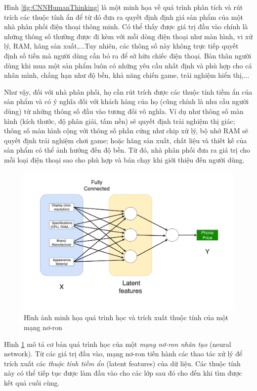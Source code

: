 Hình \ref{fig:CNNHumanThinking} là một minh họa về quá trình phân tích và rút trích các thuộc tính ẩn để từ đó đưa ra quyết định định giá sản phẩm của một nhà phân phối điện thoại thông minh. Có thể thấy được giá trị đầu vào chính là những thông số thường được đi kèm với mỗi dòng điện thoại như màn hình, vi xử lý, RAM, hãng sản xuất,...Tuy nhiên, các thông số này không trực tiếp quyết định số tiền mà người dùng cần bỏ ra để sở hữu chiếc điện thoại. Bản thân người dùng khi mua một sản phẩm luôn có những yêu cầu nhất định và phù hợp cho cá nhân mình, chẳng hạn như độ bền, khả năng chiến game, trải nghiệm hiển thị,...

Như vậy, đối với nhà phân phối, họ cần rút trích được các thuộc tính tiềm ẩn của sản phẩm và có ý nghĩa đối với khách hàng của họ (cũng chính là nhu cầu người dùng) từ những thông số đầu vào tương đối vô nghĩa. Ví dụ như thông số màn hình (kích thước, độ phân giải, tấm nền) sẽ quyết định trải nghiệm thị giác; thông số màn hình cộng với thông số phần cứng như chip xử lý, bộ nhớ RAM sẽ quyết định trải nghiệm chơi game; hoặc hãng sản xuất, chất liệu và thiết kế của sản phẩm có thể ảnh hưởng đến độ bền. Từ đó, nhà phân phối đưa ra giá trị cho mỗi loại điện thoại sao cho phù hợp và bán chạy khi giới thiệu đến người dùng.


\begin{figure}[!h]
	\centering
		\includegraphics[width=1.0\columnwidth]{books/artificial-neural-network/chapter05/figure/CNN_machine_learning.png}
		\centering
	\caption{Hình ảnh minh họa quá trình học và trích xuất thuộc tính của một mạng nơ-ron}
	\label{fig:CNNMachineLearning}
\end{figure}

Hình \ref{fig:CNNMachineLearning} mô tả cơ bản quá trình học của một \textit{mạng nơ-ron nhân tạo} (neural network). Từ các giá trị đầu vào, mạng nơ-ron tiến hành các thao tác xử lý để trích xuất các \textit{thuộc tính tiềm ẩn} (latent features) của dữ liệu. Các thuộc tính này có thể tiếp tục được làm đầu vào cho các lớp sau đó cho đến khi tìm được kết quả cuối cùng.

